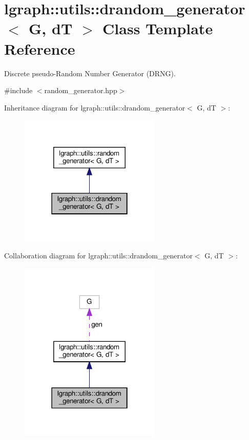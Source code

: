 \hypertarget{classlgraph_1_1utils_1_1drandom__generator}{}\section{lgraph\+:\+:utils\+:\+:drandom\+\_\+generator$<$ G, dT $>$ Class Template Reference}
\label{classlgraph_1_1utils_1_1drandom__generator}


Discrete pseudo-\/\+Random Number Generator (D\+R\+NG).  




{\ttfamily \#include $<$random\+\_\+generator.\+hpp$>$}



Inheritance diagram for lgraph\+:\+:utils\+:\+:drandom\+\_\+generator$<$ G, dT $>$\+:\nopagebreak
\begin{figure}[H]
\begin{center}
\leavevmode
\includegraphics[width=190pt]{classlgraph_1_1utils_1_1drandom__generator__inherit__graph}
\end{center}
\end{figure}


Collaboration diagram for lgraph\+:\+:utils\+:\+:drandom\+\_\+generator$<$ G, dT $>$\+:\nopagebreak
\begin{figure}[H]
\begin{center}
\leavevmode
\includegraphics[width=190pt]{classlgraph_1_1utils_1_1drandom__generator__coll__graph}
\end{center}
\end{figure}
